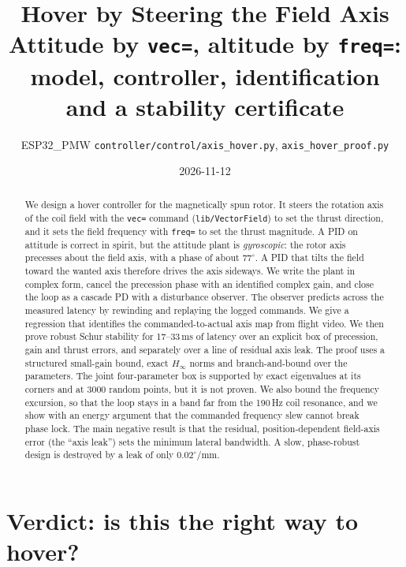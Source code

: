 \documentclass[11pt]{article}
\title{Hover by Steering the Field Axis\\[2pt]\large Attitude by \texttt{vec=}, altitude by \texttt{freq=}: model, controller, identification and a stability certificate}
\author{ESP32\_PMW \quad \texttt{controller/control/axis\_hover.py}, \texttt{axis\_hover\_proof.py}}
\date{2026-11-12}
\begin{document}
\sloppy
\maketitle

\begin{abstract}
We design a hover controller for the magnetically spun rotor. It steers the rotation axis of the
coil field with the \texttt{vec=} command (\texttt{lib/VectorField}) to set the thrust direction,
and it sets the field frequency with \texttt{freq=} to set the thrust magnitude. A PID on attitude
is correct in spirit, but the attitude plant is \emph{gyroscopic}: the rotor axis precesses about
the field axis, with a phase of about $77^\circ$. A PID that tilts the field toward the wanted axis
therefore drives the axis sideways. We write the plant in complex form, cancel the precession phase
with an identified complex gain, and close the loop as a cascade PD with a disturbance observer. The
observer predicts across the measured latency by rewinding and replaying the logged commands. We give
a regression that identifies the commanded-to-actual axis map from flight video. We then prove
robust Schur stability for 17--33\,ms of latency over an explicit box of precession, gain and thrust
errors, and separately over a line of residual axis leak. The proof uses a structured small-gain
bound, exact $H_\infty$ norms and branch-and-bound over the parameters. The joint four-parameter box
is supported by exact eigenvalues at its corners and at 3000 random points, but it is not proven. We also bound the frequency excursion, so that the loop stays in a band far from the 190\,Hz
coil resonance, and we show with an energy argument that the commanded frequency slew cannot break
phase lock. The main negative result is that the residual, position-dependent field-axis error
(the ``axis leak'') sets the minimum lateral bandwidth. A slow, phase-robust design is destroyed by
a leak of only $0.02^\circ$/mm.
\end{abstract}

\tableofcontents

\section{Verdict: is this the right way to hover?}
\end{document}
